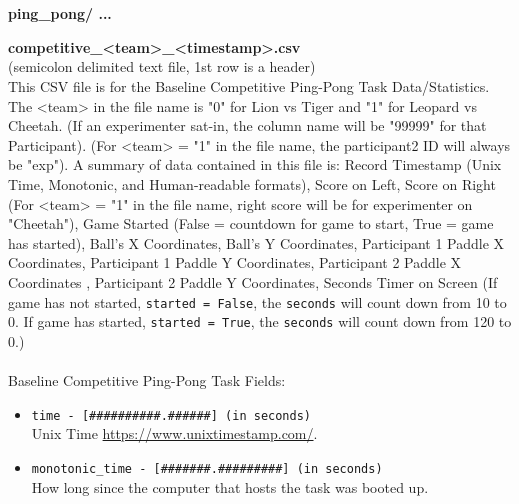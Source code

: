 \begin{description}
\begin{addmargin}[0em]{0em}
    \end{addmargin} %


    \textbf{\\\\}
    \begin{addmargin}[0em]{0em} %
        \textbf{ping\_pong/ ...}

        \begin{addmargin}[1em]{0em} %
            \label{competitive_<team>_<timestamp>.csv}
            \textbf{competitive\_<team>\_<timestamp>.csv}\\(semicolon delimited text file, 1st row is a header)\\
            This CSV file is for the Baseline Competitive Ping-Pong Task Data/Statistics.
            The <team> in the file name is "0" for Lion vs Tiger and "1" for Leopard vs Cheetah.
            (If an experimenter sat-in, the column name will be "99999" for that Participant).
            (For <team> = "1" in the file name, the participant2 ID will always be "exp").
            A summary of data contained in this file is: Record Timestamp (Unix Time, Monotonic, and Human-readable formats),
            Score on Left, Score on Right (For <team> = "1" in the file name, right score will be for experimenter on "Cheetah"), Game Started (False = countdown for game to start, True = game has started),
            Ball's X Coordinates, Ball's Y Coordinates, Participant 1 Paddle X Coordinates, Participant 1 Paddle Y Coordinates,
            Participant 2 Paddle X Coordinates , Participant 2 Paddle Y Coordinates, Seconds Timer on Screen (If game has not started, \verb|started = False|,
            the \verb|seconds| will count down from 10 to 0. If game has started, \verb|started = True|, the \verb|seconds| will count down from 120 to 0.)\\\\
            Baseline Competitive Ping-Pong Task Fields:
            \begin{itemize}
                \item \verb|time - [##########.######] (in seconds)|\\Unix Time \href{https://www.unixtimestamp.com/}{https://www.unixtimestamp.com/}.
                \item \verb|monotonic_time - [#######.#########] (in seconds)|\\How long since the computer that hosts the task was booted up.

\end{itemize}
\end{addmargin}
\end{addmargin}
\end{description}
